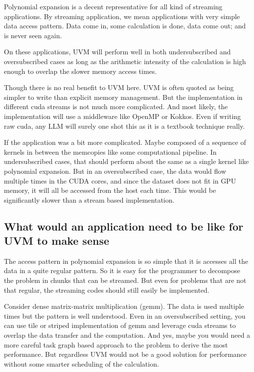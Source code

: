 \documentclass{article}
\begin{document}
Polynomial expansion is a decent representative for all kind of
streaming applications. By streaming application, we mean applications
with very simple data access pattern. Data come in, some calculation
is done, data come out; and is never seen again.

On these applications, UVM will perform well in both undersubscribed
and oversubscribed cases as long as the arithmetic intensity of the
calculation is high enough to overlap the slower memory access times.

Though there is no real benefit to UVM here. UVM is often quoted as
being simpler to write than explicit memory management. But the
implementation in different cuda streams is not much more
complicated. And most likely, the implementation will use a middleware
like OpenMP or Kokkos. Even if writing raw cuda, any LLM will surely
one shot this as it is a textbook technique really.

If the application was a bit more complicated. Maybe composed of a
sequence of kernels in between the memcopies like some computational
pipeline. In undersubscribed cases, that should perform about the same
as a single kernel like polynomial expansion.  But in an
oversubscribed case, the data would flow multiple times in the CUDA
cores, and since the dataset does not fit in GPU memory, it will all
be accessed from the host each time. This would be significantly
slower than a stream based implementation.

\subsection{What would an application need to be like for UVM to make sense}

The access pattern in polynomial expansion is so simple that it is
accesses all the data in a quite regular pattern. So it is easy for
the programmer to decompose the problem in chunks that can be
streamed. But even for problems that are not that regular, the
streaming codes should still easily be implemented.

Consider dense matrix-matrix multiplication (gemm). The data is used
multiple times but the pattern is well understood. Even in an
oversubscribed setting, you can use tile or striped implementation of
gemm and leverage cuda streams to overlap the data transfer and the
computation. And yes, maybe you would need a more careful task graph
based approach to the problem to derive the most performance. But
regardless UVM would not be a good solution for performance without
some smarter scheduling of the calculation.
\end{document}
